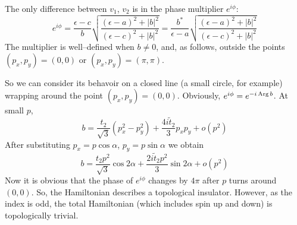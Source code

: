 The only difference between $v_1$, $v_2$ is in the phase multiplier $e^{i\phi}$:
\begin{equation}
	e^{i\phi} = \frac{\epsilon - c}{b} \sqrt{\frac{(\epsilon-a)^2+|b|^2}{(\epsilon-c)^2+|b|^2}}=
	\frac{b^*}{\epsilon - a} \sqrt{\frac{(\epsilon-a)^2+|b|^2}{(\epsilon-c)^2+|b|^2}}
\end{equation}
The multiplier is well--defined when $b \ne 0$, and, as follows, outside the points
$(p_x, p_y) = (0,0)$ or $(p_x, p_y) = (\pi, \pi)$. 

So we can consider its behavoir on a closed line (a small circle, for example) wrapping
around the point $(p_x, p_y) = (0,0)$. Obviously, $e^{i\phi} = e^{-i\operatorname{Arg}{b}}$. At small
$p$, 
\begin{equation}
	b = \frac{t_2}{\sqrt{3}}(p_x^2 - p_y^2) + \frac{4i\tilde{t}_2}{3} p_x p_y + o(p^2)
\end{equation}
After substituting $p_x = p \cos{\alpha}$, $p_y = p \sin{\alpha}$ we obtain
\begin{equation}
	b = \frac{t_2p^2}{\sqrt{3}} \cos{2\alpha} + 
			\frac{2i\tilde{t}_2p^2}{3} \sin{2\alpha} + o(p^2)
\end{equation}
Now it is obvious that the phase of $e^{i\phi}$ changes by $4\pi$ after $p$ turns around 
$(0,0)$. So, the Hamiltonian describes a topological insulator. However, as the index is
odd, the total Hamiltonian (which includes spin up and down) is topologically trivial.


